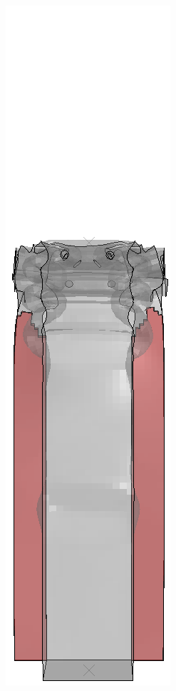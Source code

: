 \documentclass[
documentsize = a4, %
font = cmr, %
typesize = 11, %
printmode = true,
onehalfspacing = true,
language = en, %
titlepage = udciccp, %
degree = pt, %
dedication = true,
acknowledgements = true,
abstract-en = true,
abstract-es = false,
abstract-ga = false,
epigraphs = true,
toc = true,
lof = true,
lot = true,
frontmatterintoc = false,
notation = false,
minimal = false,
]{UDCthesis}
\begin{document}
\begin{figure}
\begin{minipage}[b]{.06\linewidth}
	\end{minipage}
	\quad
	\begin{minipage}[b]{.06\linewidth}
		\centering
		\includegraphics[width=\linewidth]{IMG_CUTRES/a7}

\end{minipage}
\end{figure}
\end{document}
